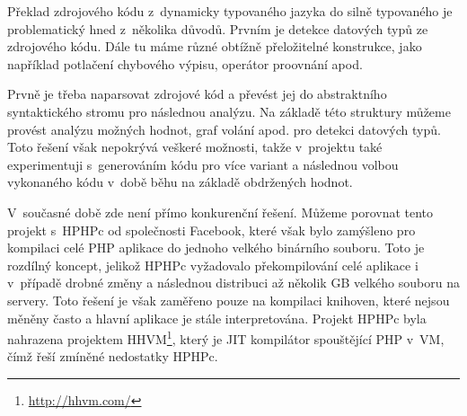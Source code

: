 \documentclass[czech]{ExcelAtFIT}
\begin{document}
		Překlad zdrojového kódu z~dynamicky typovaného jazyka do silně typovaného je problematický hned z~několika důvodů. Prvním je detekce datových typů ze zdrojového kódu. Dále tu máme různé obtížně přeložitelné konstrukce, jako například potlačení chybového výpisu, operátor proovnání apod.


		Prvně je třeba naparsovat zdrojové kód a převést jej do abstraktního syntaktického stromu pro následnou analýzu. Na základě této struktury můžeme provést analýzu možných hodnot, graf volání apod. pro detekci datových typů. Toto řešení však nepokrývá veškeré možnosti, takže v~projektu také experimentuji s~generováním kódu pro více variant a následnou volbou vykonaného kódu v~době běhu na základě obdržených hodnot.







		V~současné době zde není přímo konkurenční řešení. Můžeme porovnat tento projekt s~HPHPc od společnosti Facebook, které však bylo zamýšleno pro kompilaci celé PHP aplikace do jednoho velkého binárního souboru. Toto je rozdílný koncept, jelikož HPHPc vyžadovalo překompilování celé aplikace i v~případě drobné změny a následnou distribuci až několik GB velkého souboru na servery. Toto řešení je však zaměřeno pouze na kompilaci knihoven, které nejsou měněny často a hlavní aplikace je stále interpretována. Projekt HPHPc byla nahrazena projektem HHVM\footnote{\url{http://hhvm.com/}}, který je JIT kompilátor spouštějící PHP v~VM, čímž řeší zmíněné nedostatky HPHPc.
\end{document}
